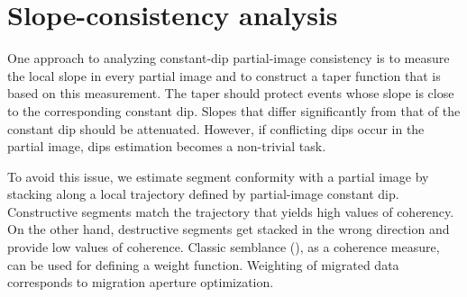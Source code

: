 \section {Slope-consistency analysis}

One approach to analyzing constant-dip partial-image consistency
is to measure the local slope in every partial image and to construct a taper function that is based on this measurement. The 
taper should protect events whose slope is close to the corresponding constant dip. Slopes that differ significantly from that of
the constant dip should be attenuated. However, if conflicting dips occur in the partial image, dips estimation becomes a non-trivial task.

To avoid this issue, we estimate segment conformity with a partial image by
stacking along a local trajectory defined by partial-image constant dip. Constructive segments match the trajectory that yields high values of coherency.
On the other hand, destructive segments get stacked in the wrong direction and provide low values of coherence.
Classic semblance (\citealp[]{taner69}), as a coherence measure, can be used for defining a weight
function. Weighting of migrated data corresponds to migration aperture optimization.

